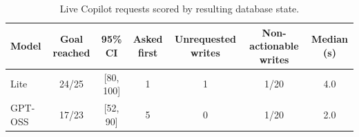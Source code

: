 \begin{table}[t]
\centering
\caption{Live Copilot requests scored by resulting database state.}
\label{tab:e4}
\small
\setlength{\tabcolsep}{3pt}
\begin{tabular}{@{}lcccccc@{}}
\toprule
Model & Goal reached & 95\% CI & Asked first & Unrequested writes & Non-actionable writes & Median (s) \\
\midrule
Lite & 24/25 & [80, 100] & 1 & 1 & 1/20 & 4.0 \\
GPT-OSS & 17/23 & [52, 90] & 5 & 0 & 1/20 & 2.0 \\
\bottomrule
\end{tabular}
\end{table}

